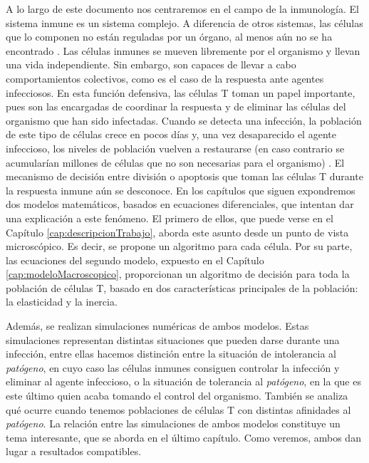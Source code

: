 A lo largo de este documento nos centraremos en el campo de la inmunología. El sistema inmune es un sistema complejo. A diferencia de otros sistemas, las células que lo componen no están reguladas por un órgano, al menos aún no se ha encontrado \citep{arias2016emergent}. Las células inmunes se mueven libremente por el organismo y llevan una vida independiente. Sin embargo, son capaces de llevar a cabo comportamientos colectivos, como es el caso de la respuesta ante agentes infecciosos. En esta función defensiva, las células T toman un papel importante, pues son las encargadas de coordinar la respuesta y de eliminar las células del organismo que han sido infectadas. Cuando se detecta una infección, la población de este tipo de células crece en pocos días y, una vez desaparecido el agente infeccioso, los niveles de población vuelven a restaurarse (en caso contrario se acumularían millones de células que no son necesarias para el organismo) \citep{fernandez2012mecanica}. El mecanismo de decisión entre división o apoptosis que toman las células T durante la respuesta inmune aún se desconoce. En los capítulos que siguen expondremos dos modelos matemáticos, basados en ecuaciones diferenciales, que intentan dar una explicación a este fenómeno. El primero de ellos, que puede verse en el Capítulo \ref{cap:descripcionTrabajo}, aborda este asunto desde un punto de vista microscópico. Es decir, se propone un algoritmo para cada célula.  Por su parte, las ecuaciones del segundo modelo, expuesto en el Capítulo \ref{cap:modeloMacroscopico}, proporcionan un algoritmo de decisión para toda la población de células T, basado en dos características principales de la población: la elasticidad y la inercia.

 

 
Además, se realizan simulaciones numéricas de ambos modelos. Estas simulaciones representan distintas situaciones que pueden darse durante una infección, entre ellas hacemos distinción entre la situación de intolerancia al \textit{patógeno}, en cuyo caso las células inmunes consiguen controlar la infección y eliminar al agente infeccioso, o la situación de tolerancia al \textit{patógeno}, en la que es este último quien acaba tomando el control del organismo. También se analiza qué ocurre cuando tenemos poblaciones de células T con distintas afinidades al \textit{patógeno}. La relación entre las simulaciones de ambos modelos constituye un tema interesante, que se aborda en el último capítulo. Como veremos, ambos dan lugar a resultados compatibles. 


